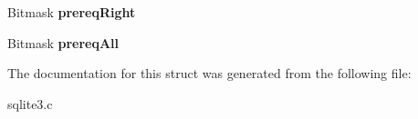 \begin{DoxyCompactItemize}
\item 
\hypertarget{struct_where_term_a1274011fa1ef0639284b7944f4570e67}{Bitmask {\bfseries prereq\-Right}}\label{struct_where_term_a1274011fa1ef0639284b7944f4570e67}

\item 
\hypertarget{struct_where_term_a49b700336b005067352366cfc40de07f}{Bitmask {\bfseries prereq\-All}}\label{struct_where_term_a49b700336b005067352366cfc40de07f}

\end{DoxyCompactItemize}


The documentation for this struct was generated from the following file\-:\begin{DoxyCompactItemize}
\item 
sqlite3.\-c\end{DoxyCompactItemize}
